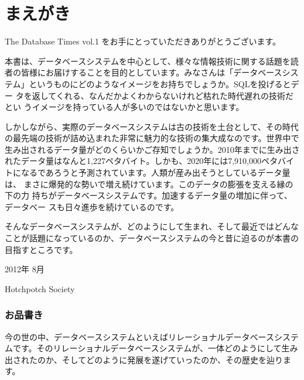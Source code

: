 
\chapter*{まえがき}
\thispagestyle{plainhead}

The Database Times vol.1 をお手にとっていただきありがとうございます。

本書は、データベースシステムを中心として、様々な情報技術に関する話題を読
者の皆様にお届けすることを目的としています。みなさんは「データベースシス
テム」というものにどのようなイメージをお持ちでしょうか。SQLを投げるとデー
タを返してくれる、なんだかよくわからないけれど枯れた時代遅れの技術だとい
うイメージを持っている人が多いのではないかと思います。

しかしながら、実際のデータベースシステムは古の技術を土台として、その時代
の最先端の技術が詰め込まれた非常に魅力的な技術の集大成なのです。世界中で
生み出されるデータ量がどのくらいかご存知でしょうか。2010年までに生み出さ
れたデータ量はなんと1,227ペタバイト。しかも、2020年には7,910,000ペタバイ
トになるであろうと予測されています。人類が産み出そうとしているデータ量は、
まさに爆発的な勢いで増え続けています。このデータの膨張を支える縁の下の力
持ちがデータベースシステムです。加速するデータ量の増加に伴って、データベー
スも日々進歩を続けているのです。

そんなデータベースシステムが、どのようにして生まれ、そして最近ではどんな
ことが話題になっているのか、データベースシステムの今と昔に迫るのが本書の
目指すところです。

\begin{flushright}
 2012年 8月

Hotchpotch Society
\end{flushright}

\newpage

\subsection*{お品書き}


今の世の中、データベースシステムといえばリレーショナルデータベースシステ
ムです。そのリレーショナルデータベースシステムが、一体どのようにして生み
出されたのか、そしてどのように発展を遂げていったのか、その歴史を辿ります。

\vspace*{\Cvs}


